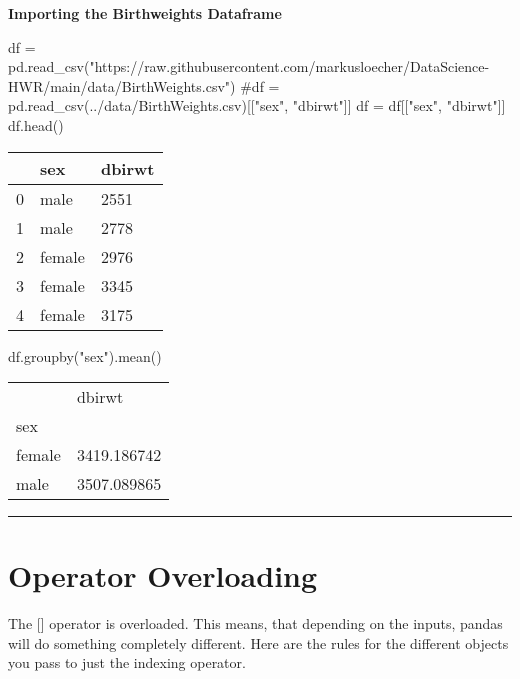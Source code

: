 \documentclass[
  letterpaper,
  DIV=11,
  numbers=noendperiod]{scrreprt}
\newenvironment{Shaded}{\begin{snugshade}}{\end{snugshade}}
\newcommand{\CommentTok}[1]{\textcolor[rgb]{0.37,0.37,0.37}{#1}}
\newcommand{\NormalTok}[1]{\textcolor[rgb]{0.00,0.23,0.31}{#1}}
\newcommand{\OperatorTok}[1]{\textcolor[rgb]{0.37,0.37,0.37}{#1}}
\newcommand{\StringTok}[1]{\textcolor[rgb]{0.13,0.47,0.30}{#1}}
\begin{document}
\textbf{Importing the Birthweights Dataframe}

\begin{Shaded}
\begin{Highlighting}[]
\NormalTok{df }\OperatorTok{=}\NormalTok{ pd.read\_csv(}\StringTok{"https://raw.githubusercontent.com/markusloecher/DataScience{-}HWR/main/data/BirthWeights.csv"}\NormalTok{)}
\CommentTok{\#df = pd.read\_csv(\textquotesingle{}../data/BirthWeights.csv\textquotesingle{})[["sex", "dbirwt"]]}
\NormalTok{df }\OperatorTok{=}\NormalTok{ df[[}\StringTok{"sex"}\NormalTok{, }\StringTok{"dbirwt"}\NormalTok{]]}
\NormalTok{df.head()}
\end{Highlighting}
\end{Shaded}

\begin{longtable}[]{@{}lll@{}}
\toprule()
& sex & dbirwt \\
\midrule()
\endhead
0 & male & 2551 \\
1 & male & 2778 \\
2 & female & 2976 \\
3 & female & 3345 \\
4 & female & 3175 \\
\bottomrule()
\end{longtable}

\begin{Shaded}
\begin{Highlighting}[]
\NormalTok{df.groupby(}\StringTok{"sex"}\NormalTok{).mean()}
\end{Highlighting}
\end{Shaded}

\begin{longtable}[]{@{}ll@{}}
\toprule()
& dbirwt \\
sex & \\
\midrule()
\endhead
female & 3419.186742 \\
male & 3507.089865 \\
\bottomrule()
\end{longtable}

\begin{center}\rule{0.5\linewidth}{0.5pt}\end{center}

\hypertarget{operator-overloading}{%
\section{Operator Overloading}\label{operator-overloading}}

The {[}{]} operator is overloaded. This means, that depending on the
inputs, pandas will do something completely different. Here are the
rules for the different objects you pass to just the indexing operator.
\end{document}
